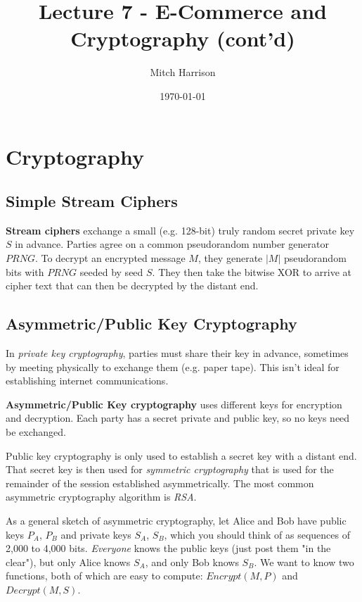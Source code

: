\documentclass[titlepage, 12pt, leqno]{article}
\title{\Huge{Lecture 7 - E-Commerce and Cryptography (cont'd)}}
\author{\large{Mitch Harrison}}
\date{\today}
\begin{document}
\setlength{\parskip}{1\baselineskip}
\setlength{\parindent}{15pt}
\maketitle
\tableofcontents
\newpage


\section{Cryptography}

\subsection{Simple Stream Ciphers}
\textbf{Stream ciphers} exchange a small (e.g. 128-bit) truly random secret
private key $S$ in advance. Parties agree on a common pseudorandom number 
generator $PRNG$. To decrypt an encrypted message $M$, they generate $|M|$
pseudorandom bits with $PRNG$ seeded by seed $S$. They then take the bitwise
XOR to arrive at cipher text that can then be decrypted by the distant end.

\subsection{Asymmetric/Public Key Cryptography}
In \textit{private key cryptography}, parties must share their key in advance,
sometimes by meeting physically to exchange them (e.g. paper tape). This isn't
ideal for establishing internet communications.

\begin{definition}
    \textbf{Asymmetric/Public Key cryptography} uses different keys for
    encryption and decryption. Each party has a secret private and public key,
    so no keys need be exchanged.
\end{definition}

Public key cryptography is only used to establish a secret key with a distant end.
That secret key is then used for \textit{symmetric cryptography} that is used for
the remainder of the session established asymmetrically. The most common 
asymmetric cryptography algorithm is \textit{RSA}.

As a general sketch of asymmetric cryptography, let Alice and Bob have public keys
$P_{A}$, $P_{B}$ and private keys $S_{A}$, $S_{B}$, which you should think of as
sequences of 2,000 to 4,000 bits. \textit{Everyone} knows the public keys (just
post them "in the clear"), but only Alice knows $S_{A}$, and only Bob knows
$S_{B}$. We want to know two functions, both of which are easy to compute:
$Encrypt(M,P)$ and $Decrypt(M,S)$.
\end{document}
